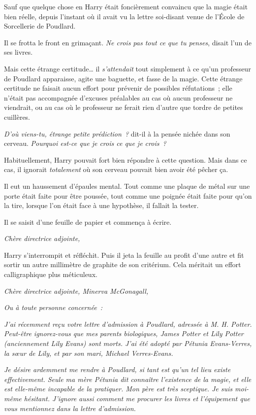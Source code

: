 Sauf que quelque chose en Harry était foncièrement convaincu que la magie était bien réelle, depuis l'instant où il avait vu la lettre soi-disant venue de l'École de Sorcellerie de Poudlard. 

Il se frotta le front en grimaçant. \emph{Ne crois pas tout ce que tu penses}, disait l'un de ses livres. 

Mais cette étrange certitude\ldots{} il \emph{s'attendait} tout simplement à ce qu'un professeur de Poudlard apparaisse, agite une baguette, et fasse de la magie. Cette étrange certitude ne faisait aucun effort pour prévenir de possibles réfutations~; elle n'était pas accompagnée d'excuses préalables au cas où aucun professeur ne viendrait, ou au cas où le professeur ne ferait rien d'autre que tordre de petites cuillères. 

\emph{D'où viens-tu, étrange petite prédiction~?} dit-il à la pensée nichée dans son cerveau. \emph{Pourquoi est-ce que je crois ce que je crois~?} 

Habituellement, Harry pouvait fort bien répondre à cette question. Mais dans ce cas, il ignorait \emph{totalement} où son cerveau pouvait bien avoir été pêcher ça. 

Il eut un haussement d'épaules mental. Tout comme une plaque de métal sur une porte était faite pour être poussée, tout comme une poignée était faite pour qu'on la tire, lorsque l'on était face à une hypothèse, il fallait la tester. 

Il se saisit d'une feuille de papier et commença à écrire. 

\emph{Chère directrice adjointe,} 

Harry s'interrompit et réfléchit. Puis il jeta la feuille au profit d'une autre et fit sortir un autre millimètre de graphite de son critérium. Cela méritait un effort calligraphique plus méticuleux. 

\emph{Chère directrice adjointe, Minerva McGonagall,} 

\emph{Ou à toute personne concernée~:} 

\emph{J'ai récemment reçu votre lettre d'admission à Poudlard, adressée à M. H. Potter. Peut-être ignorez-vous que mes parents biologiques, James Potter et Lily Potter (anciennement Lily Evans) sont morts. J'ai été adopté par Pétunia Evans-Verres, la sœur de Lily, et par son mari, Michael Verres-Evans.} 

\emph{Je désire ardemment me rendre à Poudlard, si tant est qu'un tel lieu existe effectivement. Seule ma mère Pétunia dit connaître l'existence de la magie, et elle est elle-même incapable de la pratiquer. Mon père est très sceptique. Je suis moi-même hésitant. J'ignore aussi comment me procurer les livres et l'équipement que vous mentionnez dans la lettre d'admission.} 


